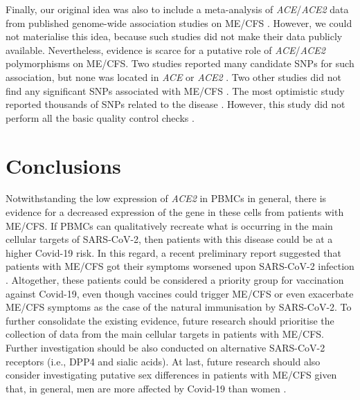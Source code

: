 Finally, our original idea was also to include a meta-analysis of \textit{ACE}/\textit{ACE2} data from published genome-wide association studies on ME/CFS \citep{smithConvergentGenomicStudies2011, schlauch2016GenomewideAssociation, herrera2018GenomeepigenomeInteractions, perezGeneticPredispositionImmune2019, dibble2020GeneticRisk}. However, we could not materialise this idea, because such studies did not make their data publicly available. Nevertheless, evidence is scarce for a putative role of \textit{ACE}/\textit{ACE2} polymorphisms on ME/CFS. Two studies reported many candidate SNPs for such association, but none was located in \textit{ACE} or \textit{ACE2} \citep{smithConvergentGenomicStudies2011, schlauch2016GenomewideAssociation}. Two other studies did not find any significant SNPs associated with ME/CFS \citep{herrera2018GenomeepigenomeInteractions, dibble2020GeneticRisk}. The most optimistic study reported thousands of SNPs related to the disease \citep{perezGeneticPredispositionImmune2019}. However, this study did not perform all the basic quality control checks \citep{grabowska2020ReviewQuality}.

\section{Conclusions}

Notwithstanding the low expression of \textit{ACE2} in PBMCs in general, there is evidence for a decreased expression of the gene in these cells from patients with ME/CFS. If PBMCs can qualitatively recreate what is occurring in the main cellular targets of SARS-CoV-2, then patients with this disease could be at a higher Covid-19 risk. In this regard, a recent preliminary report suggested that patients with ME/CFS got their symptoms worsened upon SARS-CoV-2 infection \citep{actionform.e.2021ReportImpact}. Altogether, these patients could be considered a priority group for vaccination against Covid-19, even though vaccines could trigger ME/CFS \citep{gherardi2019MyalgiaChronic, phelanPotentialAntigenicMimicry2020} or even exacerbate ME/CFS symptoms as the case of the natural immunisation by SARS-CoV-2. To further consolidate the existing evidence, future research should prioritise the collection of data from the main cellular targets in patients with ME/CFS. Further investigation should be also conducted on alternative SARS-CoV-2 receptors (i.e., DPP4 and sialic acids). At last, future research should also consider investigating putative sex differences in patients with ME/CFS given that, in general, men are more affected by Covid-19 than women \citep{gadi2020WhatSex}.

